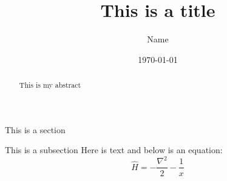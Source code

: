 \documentclass{article}
\title{This is a title}
\author{Name}
\date{\today}
\begin{document}
\maketitle
\begin{abstract}
This is my abstract
\end{abstract}
\begin{section}{This is a section}
\begin{subsection}{This is a subsection}
Here is text and below is an equation:
\begin{equation}
\hat H = -\frac{\nabla^2}{2} - \frac{1}{x}
\end{equation}
\end{subsection}
\end{section}
\end{document}
